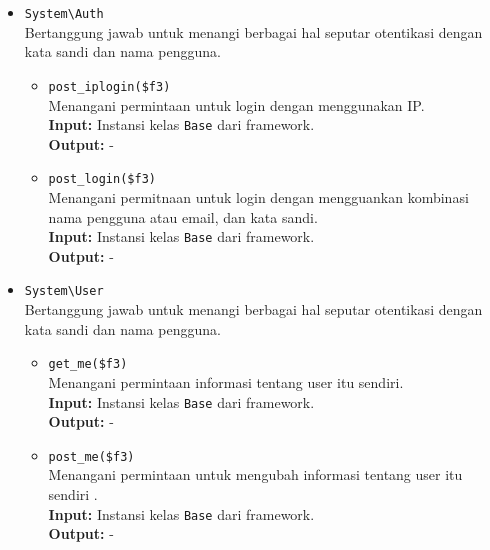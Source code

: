 \begin{itemize}
        \item \texttt{System\textbackslash Auth} \\
            Bertanggung jawab untuk menangi berbagai hal seputar otentikasi
            dengan kata sandi dan nama pengguna.
            \begin{itemize}
                \item \texttt{post\_iplogin(\$f3)}\\
                    Menangani permintaan untuk login dengan menggunakan IP.\\
                    \textbf{Input:} Instansi kelas \texttt{Base} dari
                    framework.\\
                    \textbf{Output:} -
                
                \item \texttt{post\_login(\$f3)}\\
                    Menangani permitnaan untuk login dengan mengguankan
                    kombinasi nama pengguna atau email, dan kata sandi.\\
                    \textbf{Input:} Instansi kelas \texttt{Base} dari
                    framework.\\
                    \textbf{Output:} -
            \end{itemize}

        \item \texttt{System\textbackslash User} \\
            Bertanggung jawab untuk menangi berbagai hal seputar otentikasi
            dengan kata sandi dan nama pengguna.
            \begin{itemize}
                \item \texttt{get\_me(\$f3)}\\
                    Menangani permintaan informasi tentang user itu sendiri.\\
                    \textbf{Input:} Instansi kelas \texttt{Base} dari
                    framework.\\
                    \textbf{Output:} -
                
                \item \texttt{post\_me(\$f3)}\\
                    Menangani permintaan untuk mengubah informasi tentang user
                    itu sendiri .\\
                    \textbf{Input:} Instansi kelas \texttt{Base} dari
                    framework.\\
                    \textbf{Output:} -
            \end{itemize}
    \end{itemize}
    
